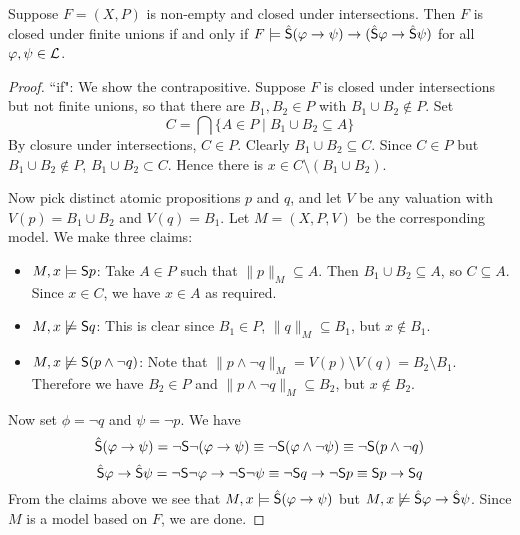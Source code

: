 \begin{proposition}
\label{prop_finite_unions_frame_condition}

    Suppose $F = (X, P)$ is non-empty and closed under intersections. Then $F$
    is closed under finite unions if and only if $F \models \hat{\S}(\phi
    \limplies \psi) \limplies (\hat{\S}\phi \limplies \hat{\S}\psi)$ for all
    $\phi, \psi \in \cL$.

\begin{proof}

    ``if": We show the contrapositive. Suppose $F$ is closed under
    intersections but not finite unions, so that there are $B_1, B_2
    \in P$ with $B_1 \cup B_2 \notin P$. Set
    \[
    C = \bigcap\{A \in P \mid B_1 \cup B_2 \subseteq A\}\]
    By closure under intersections, $C \in P$. Clearly $B_1 \cup
    B_2 \subseteq C$. Since $C \in P$ but $B_1 \cup B_2 \notin
    P$, $B_1 \cup B_2 \subset C$. Hence there is $x \in C
    \setminus (B_1 \cup B_2)$.

    Now pick distinct atomic propositions $p$ and $q$, and let $V$ be any
    valuation with $V(p) = B_1 \cup B_2$ and $V(q) = B_1$. Let $M = (X, P, V)$
    be the corresponding model. We make three claims:

    \begin{itemize}\small

        \item $M, x \models \S p$: Take $A \in P$ such that $\|p\|_M \subseteq
              A$. Then $B_1 \cup B_2 \subseteq A$, so $C \subseteq A$. Since $x
              \in C$, we have $x \in A$ as required.

        \item $M, x \not\models \S q$: This is clear since $B_1 \in P$,
              $\|q\|_M \subseteq B_1$, but $x \notin B_1$.

        \item $M, x \not\models \S (p \land \neg q)$: Note that $\|p \land \neg
              q\|_M = V(p) \setminus V(q) = B_2 \setminus B_1$. Therefore we
              have $B_2 \in P$ and $\|p \land \neg q\|_M \subseteq B_2$, but $x
              \notin B_2$.

    \end{itemize}

    Now set $\phi = \neg q$ and $\psi = \neg p$. We have
    \[
       \hat{\S}(\phi \limplies \psi)
       = \neg\S\neg(\phi \limplies \psi)
       \equiv \neg\S(\phi \land \neg\psi)
       \equiv \neg\S(p \land \neg q)
    \]
    \[
       \hat{\S}\phi \limplies \hat{\S}\psi
       = \neg\S\neg\phi \limplies \neg\S\neg\psi
       \equiv \neg\S q \limplies \neg\S p
       \equiv \S p \limplies \S q
    \]
    From the claims above we see that $M, x \models \hat{\S}(\phi
    \limplies \psi)$ but $M, x \not\models \hat{\S}\phi \limplies
    \hat{\S}\psi$. Since $M$ is a model based on $F$, we are
    done.


\end{proof}
\end{proposition}
